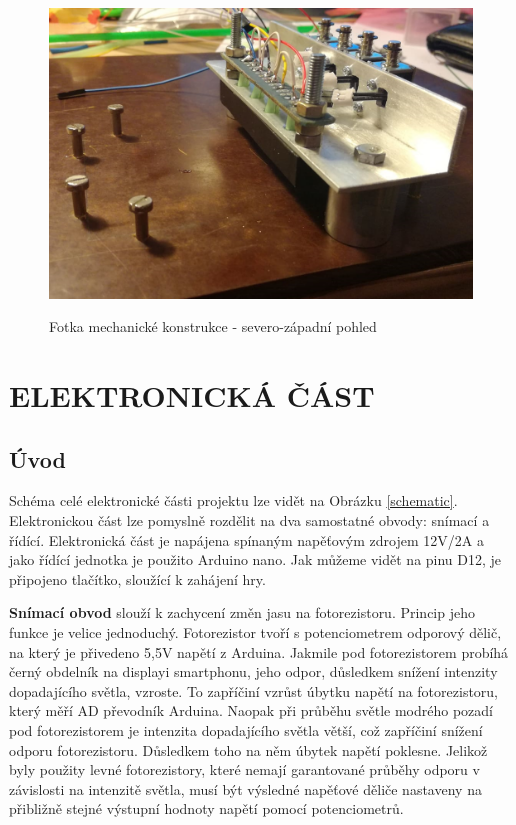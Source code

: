 \documentclass[12pt,oneside]{book} %
\begin{document}
\begin{figure}[ht] \large\centering
\includegraphics[width=1.00\textwidth]{./img/konstr1.png}\\[1cm] 
\caption{Fotka mechanické konstrukce - severo-západní pohled}
\label{konstr1}
\end{figure} 
\part{ELEKTRONICKÁ ČÁST}\label{elektro}

\chapter{Úvod}\label{uvodelektro}
\qquad Schéma celé elektronické části projektu lze vidět na Obrázku \ref{schematic}. Elektronickou část lze pomyslně rozdělit na dva samostatné obvody: snímací a řídící. Elektronická část je napájena spínaným napěťovým zdrojem 12V/2A a jako řídící jednotka je použito Arduino nano. Jak můžeme vidět na pinu D12, je připojeno tlačítko, sloužící k zahájení hry.

\qquad \textbf{Snímací obvod} slouží k zachycení změn jasu na fotorezistoru. Princip jeho funkce je velice jednoduchý. Fotorezistor tvoří s potenciometrem odporový dělič, na který je přivedeno 5,5V napětí z Arduina. Jakmile pod fotorezistorem probíhá černý obdelník na displayi smartphonu, jeho odpor, důsledkem snížení intenzity dopadajícího světla, vzroste. To zapříčiní vzrůst úbytku napětí na fotorezistoru, který měří AD převodník Arduina. Naopak při průběhu světle modrého pozadí pod fotorezistorem je intenzita dopadajícího světla větší, což zapříčiní snížení odporu fotorezistoru. Důsledkem toho na něm úbytek napětí poklesne. Jelikož byly použity levné fotorezistory, které nemají garantované průběhy odporu v závislosti na intenzitě světla, musí být výsledné napěťové děliče nastaveny na přibližně stejné výstupní hodnoty napětí pomocí potenciometrů.
\end{document}
